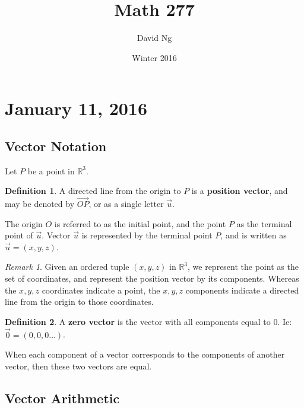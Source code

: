 \documentclass[11pt]{article}
\theoremstyle{plain} %
\theoremstyle{definition}
\newtheorem*{definition}{Definition} %
\theoremstyle{example}
\theoremstyle{remark}
\newtheorem*{remark}{Remark}
\begin{document}
\title{Math 277}
\author{David Ng}
\date{Winter 2016}
\maketitle

\tableofcontents

\eject


\section{January 11, 2016}

\subsection{Vector Notation}

Let $P$ be a point in $\mathbb R^3$.
\begin {definition}

A directed line from the origin to $P$ is a \textbf{position vector}, and may be denoted by $\overrightarrow{OP}$, or as a single letter $\vec{u}$. 
\end{definition} 


The origin $O$ is referred to as the initial point, and the point $P$ as the terminal point of $\vec{u}$. Vector $\vec{u}$ is represented by the terminal point $P$, and is written as $\vec{u} = (x, y, z)$.
\bigskip
\begin{remark}

Given an ordered tuple $(x, y, z)$ in $\mathbb R^3$, we represent the point as the set of coordinates, and represent the position vector by its components. Whereas the $x, y, z$ coordinates indicate a point, the $x, y, z$ components indicate a directed line from the origin to those coordinates. 
\end{remark}

\begin{definition}
A \textbf{zero vector} is the vector with all components equal to 0. Ie: $\overrightarrow{0} = (0,0,0\dots)$.
\end{definition}
When each component of a vector corresponds to the components of another vector, then these two vectors are equal. 

\subsection{Vector Arithmetic}
\end{document}
